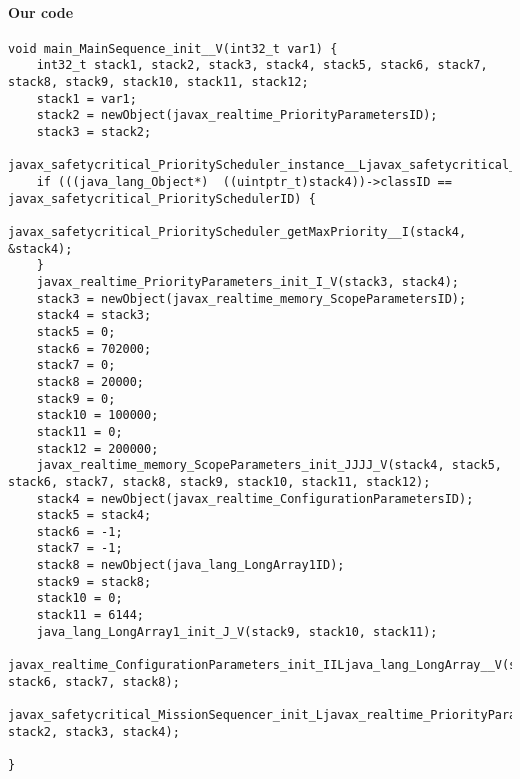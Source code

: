 \paragraph{Our code}\hfill
\begin{lstlisting}[firstnumber=1297]
void main_MainSequence_init__V(int32_t var1) {
	int32_t stack1, stack2, stack3, stack4, stack5, stack6, stack7, stack8, stack9, stack10, stack11, stack12;
	stack1 = var1;
	stack2 = newObject(javax_realtime_PriorityParametersID);
	stack3 = stack2;
	javax_safetycritical_PriorityScheduler_instance__Ljavax_safetycritical_PriorityScheduler_(&stack4);
	if (((java_lang_Object*)  ((uintptr_t)stack4))->classID == javax_safetycritical_PrioritySchedulerID) {
		javax_safetycritical_PriorityScheduler_getMaxPriority__I(stack4, &stack4);
	}
	javax_realtime_PriorityParameters_init_I_V(stack3, stack4);
	stack3 = newObject(javax_realtime_memory_ScopeParametersID);
	stack4 = stack3;
	stack5 = 0;
	stack6 = 702000;
	stack7 = 0;
	stack8 = 20000;
	stack9 = 0;
	stack10 = 100000;
	stack11 = 0;
	stack12 = 200000;
	javax_realtime_memory_ScopeParameters_init_JJJJ_V(stack4, stack5, stack6, stack7, stack8, stack9, stack10, stack11, stack12);
	stack4 = newObject(javax_realtime_ConfigurationParametersID);
	stack5 = stack4;
	stack6 = -1;
	stack7 = -1;
	stack8 = newObject(java_lang_LongArray1ID);
	stack9 = stack8;
	stack10 = 0;
	stack11 = 6144;
	java_lang_LongArray1_init_J_V(stack9, stack10, stack11);
	javax_realtime_ConfigurationParameters_init_IILjava_lang_LongArray__V(stack5, stack6, stack7, stack8);
	javax_safetycritical_MissionSequencer_init_Ljavax_realtime_PriorityParameters_Ljavax_realtime_memory_ScopeParameters_Ljavax_realtime_ConfigurationParameters__V(stack1, stack2, stack3, stack4);

}
\end{lstlisting}

